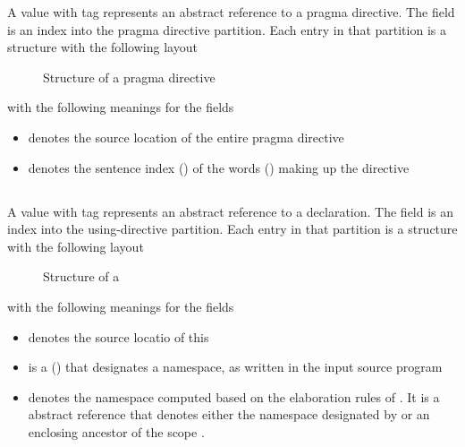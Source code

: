 A  value with tag  represents an abstract reference to a pragma directive.
The  field is an index into the pragma directive partition.
Each entry in that partition is a structure with the following layout
%
\begin{figure}[H]
    \centering
    \caption{Structure of a pragma directive}
    \label{fig:ifc:DirSort:Pragma}
\end{figure}
%
with the following meanings for the fields
\begin{itemize}
    \item {} denotes the source location of the entire pragma directive
    \item {} denotes the sentence index () of the words () making up the directive
\end{itemize}


\subsection{}
\label{sec:ifc:DirSort:Using}

A  value with tag  represents an abstract reference to a  declaration.
The  field is an index into the using-directive partition.
Each entry in that partition is a structure with the following layout
%
\begin{figure}[H]
    \centering
    \caption{Structure of a }
    \label{fig:ifc:DirSort:Using}
\end{figure}
%
with the following meanings for the fields
\begin{itemize}
    \item {} denotes the source locatio of this 
    \item {} is a  () that designates a namespace, as written in the input source program
    \item {} denotes the namespace computed based on the elaboration rules of .  
    It is a  abstract reference that denotes either
      the namespace designated by  or an enclosing ancestor of the scope .
\end{itemize}
  
